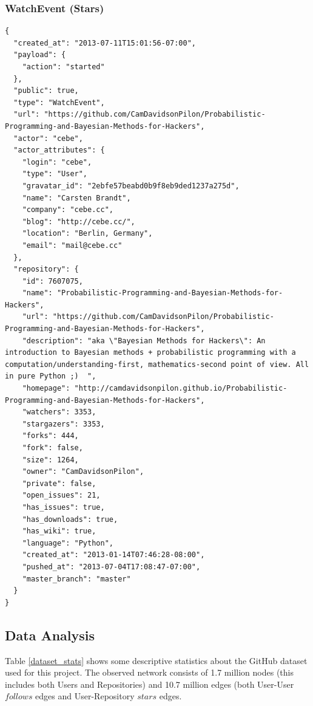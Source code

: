 \subsubsection{WatchEvent (Stars)}
\begin{lstlisting}[style=lstStyleCpp, caption={peep this JSON object dawg},
label=watchEventListing]
{
  "created_at": "2013-07-11T15:01:56-07:00",
  "payload": {
    "action": "started"
  },
  "public": true,
  "type": "WatchEvent",
  "url": "https://github.com/CamDavidsonPilon/Probabilistic-Programming-and-Bayesian-Methods-for-Hackers",
  "actor": "cebe",
  "actor_attributes": {
    "login": "cebe",
    "type": "User",
    "gravatar_id": "2ebfe57beabd0b9f8eb9ded1237a275d",
    "name": "Carsten Brandt",
    "company": "cebe.cc",
    "blog": "http://cebe.cc/",
    "location": "Berlin, Germany",
    "email": "mail@cebe.cc"
  },
  "repository": {
    "id": 7607075,
    "name": "Probabilistic-Programming-and-Bayesian-Methods-for-Hackers",
    "url": "https://github.com/CamDavidsonPilon/Probabilistic-Programming-and-Bayesian-Methods-for-Hackers",
    "description": "aka \"Bayesian Methods for Hackers\": An introduction to Bayesian methods + probabilistic programming with a computation/understanding-first, mathematics-second point of view. All in pure Python ;)  ",
    "homepage": "http://camdavidsonpilon.github.io/Probabilistic-Programming-and-Bayesian-Methods-for-Hackers",
    "watchers": 3353,
    "stargazers": 3353,
    "forks": 444,
    "fork": false,
    "size": 1264,
    "owner": "CamDavidsonPilon",
    "private": false,
    "open_issues": 21,
    "has_issues": true,
    "has_downloads": true,
    "has_wiki": true,
    "language": "Python",
    "created_at": "2013-01-14T07:46:28-08:00",
    "pushed_at": "2013-07-04T17:08:47-07:00",
    "master_branch": "master"
  }
}
\end{lstlisting}





\subsection{Data Analysis}

Table \ref{dataset_stats} shows some descriptive statistics about the GitHub dataset used for this project. The observed network consists of 1.7 million nodes (this includes both Users and Repositories) and 10.7 million edges (both User-User $follows$ edges and User-Repository $stars$ edges. 


